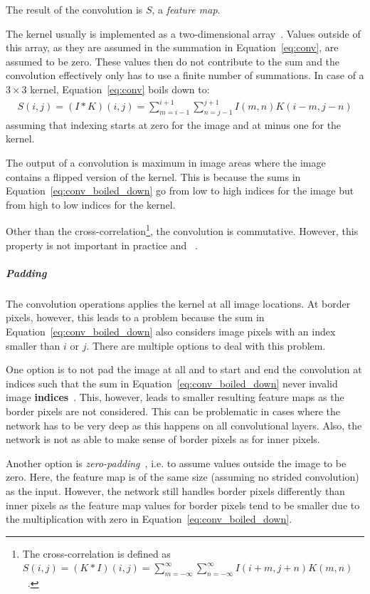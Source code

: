 The result of the convolution is $S$, a \textit{feature map}.

The kernel usually is implemented as a two-dimensional array~\citep[p. 327]{Goodfellow-et-al-2016}.
Values outside of this array, as they are assumed in the summation in Equation~\ref{eq:conv}, are assumed to be zero.
These values then do not contribute to the sum and the convolution effectively only has to use a finite number of summations.
In case of a $3\times 3$ kernel, Equation~\ref{eq:conv} boils down to:
\begin{align}
    S(i, j)=(I * K)(i, j)=\sum_{m=i-1}^{i+1} \sum_{n=j-1}^{j+1} I(m, n) K(i-m, j-n) \label{eq:conv_boiled_down}
\end{align}
assuming that indexing starts at zero for the image and at minus one for the kernel.

The output of a convolution is maximum in image areas where the image contains a flipped version of the kernel.
This is because the sums in Equation~\ref{eq:conv_boiled_down} go from low to high indices for the image but from high to low indices for the kernel.

Other than the cross-correlation\footnote{The cross-correlation is defined as $S(i, j)=(K * I)(i, j)=\sum_{m=-\infty}^{\infty} \sum_{n=-\infty}^{\infty} I(i+m, j+n) K(m, n)$~\citep[p. 329]{Goodfellow-et-al-2016}.}, the convolution is commutative.
However, this property is not important in practice and ~\citep[p. 329]{Goodfellow-et-al-2016}.

\subparagraph{Padding}
The convolution operations applies the kernel at all image locations.
At border pixels, however, this leads to a problem because the sum in Equation~\ref{eq:conv_boiled_down} also considers image pixels with an index smaller than $i$ or $j$.
There are multiple options to deal with this problem.

One option is to not pad the image at all and to start and end the convolution at indices such that the sum in Equation~\ref{eq:conv_boiled_down} never  invalid image \textbf{indices}~\citep[p. 350]{Goodfellow-et-al-2016}.
This, however, leads to smaller resulting feature maps as the border pixels are not considered.
This can be problematic in cases where the network has to be very deep as this happens on all convolutional layers.
Also, the network is not as able to make sense of border pixels as for inner pixels.

Another option is \textit{zero-padding}~\citep[p. 350]{Goodfellow-et-al-2016}, i.e. to assume values outside the image to be zero.
Here, the feature map is of the same size (assuming no strided convolution) as the input.
However, the network still handles border pixels differently than inner pixels as the feature map values for border pixels tend to be smaller due to the multiplication with zero in Equation~\ref{eq:conv_boiled_down}.

